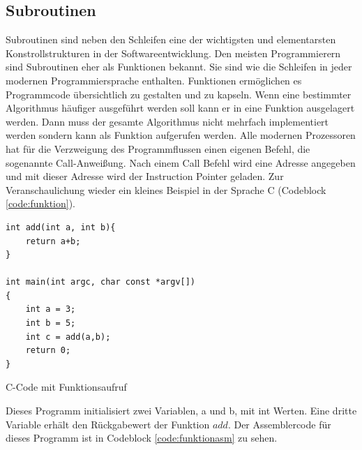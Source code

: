\documentclass[12pt]{article}
\begin{document}
\subsection{Subroutinen} \label{subsec:subroutinen}
Subroutinen sind neben den Schleifen eine der wichtigsten und elementarsten Konstrollstrukturen in der Softwareentwicklung. Den meisten Programmierern sind Subroutinen eher als Funktionen bekannt. Sie sind wie die Schleifen in jeder modernen Programmiersprache enthalten. Funktionen ermöglichen es Programmcode übersichtlich zu gestalten und zu kapseln. Wenn eine bestimmter Algorithmus häufiger ausgeführt werden soll kann er in eine Funktion ausgelagert werden. Dann muss der gesamte Algorithmus nicht mehrfach implementiert werden sondern kann als Funktion aufgerufen werden. Alle modernen Prozessoren hat für die Verzweigung des Programmflussen einen eigenen Befehl, die sogenannte Call-Anweißung. Nach einem Call Befehl wird eine Adresse angegeben und mit dieser Adresse wird der Instruction Pointer geladen. Zur Veranschaulichung wieder ein kleines Beispiel in der Sprache C (Codeblock \ref{code:funktion}).  

\begin{code}[!htb]
\begin{lstlisting}
int add(int a, int b){
	return a+b;
}

int main(int argc, char const *argv[])
{
	int a = 3;
	int b = 5;
	int c = add(a,b); 
	return 0;
}
\end{lstlisting}
\caption[C Code Funktionen]{C-Code mit Funktionsaufruf}
\label{code:funktion}
\end{code}

\noindent Dieses Programm initialisiert zwei Variablen, a und b, mit int Werten. Eine dritte Variable erhält den Rückgabewert der Funktion $add$. Der Assemblercode für dieses Programm ist in Codeblock \ref{code:funktionasm} zu sehen. 
 
\end{document}
